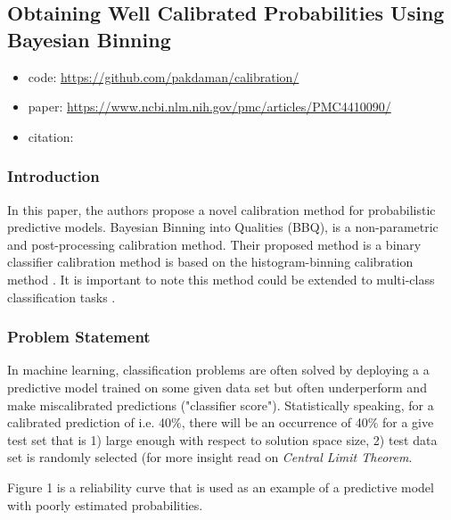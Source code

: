 \documentclass[11pt]{article}
\begin{document}
\subsection{Obtaining Well Calibrated Probabilities Using Bayesian Binning}

\begin{itemize}
      \item code: \url{https://github.com/pakdaman/calibration/}
      \item paper: \url{https://www.ncbi.nlm.nih.gov/pmc/articles/PMC4410090/}
      \item citation: \cite{naeini2015obtaining}
\end{itemize}

      \subsubsection{Introduction}
      \par In this paper, the authors propose a novel calibration method for
      probabilistic predictive models. Bayesian Binning into Qualities (BBQ),
      is a non-parametric and post-processing calibration method. Their
      proposed method is a binary classifier calibration method is based on the
      histogram-binning calibration method \cite{zadrozny2001obtaining}. It is
      important to note this method could be extended to multi-class
      classification tasks \cite{zadrozny2002transforming}.

      \subsubsection{Problem Statement}
      \par In machine learning, classification problems are often solved by deploying a
      a predictive model trained on some given data set but often underperform and
      make miscalibrated predictions ("classifier score"). Statistically speaking, for
      a calibrated prediction of i.e. 40\%, there will be an occurrence of 40\% for a
      give test set that is 1) large enough with respect to solution space size, 2)
      test data set is randomly selected (for more insight read on
      \textit{Central Limit Theorem}.

      Figure 1 is a reliability curve \cite{degroot1983comparison}
      \cite{niculescu2005predicting} that is used as an example of a predictive
      model with poorly estimated probabilities.

\end{document}
